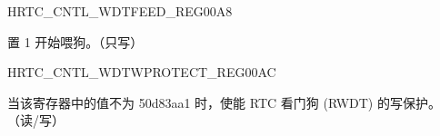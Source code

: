 \begin{register}{H}{RTC\_CNTL\_WDTFEED\_REG}{\hexprefix{}00A8}\label{regdesc:RTCCNTLWDTFEEDREG}
%
%
\regnewline%
\begin{regdesc}\begin{reglist}
\label{fielddesc:RTCCNTLRTCWDTFEED}\item [RTC\_CNTL\_RTC\_WDT\_FEED] 置 1 开始喂狗。（只写）
\end{reglist}\end{regdesc}
\end{register}


\begin{register}{H}{RTC\_CNTL\_WDTWPROTECT\_REG}{\hexprefix{}00AC}\label{regdesc:RTCCNTLWDTWPROTECTREG}
%
\regnewline%
\begin{regdesc}\begin{reglist}
\label{fielddesc:RTCCNTLWDTWKEY}\item [RTC\_CNTL\_WDT\_WKEY] 当该寄存器中的值不为 \hexprefix{}50d83aa1 时，使能 RTC 看门狗 (RWDT) 的写保护。（读/写）
\end{reglist}\end{regdesc}
\end{register}


